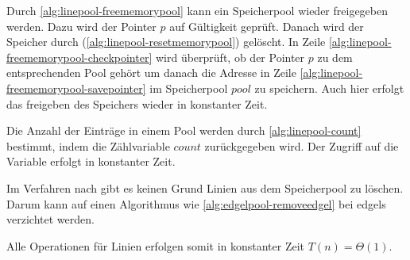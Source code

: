 

Durch \autoref{alg:linepool-freememorypool} kann ein Speicherpool wieder freigegeben werden. Dazu wird der Pointer $p$
 auf Gültigkeit geprüft. Danach wird der Speicher durch 
 (\autoref{alg:linepool-resetmemorypool}) gelöscht. In Zeile \ref{alg:linepool-freememorypool-checkpointer} wird
 überprüft, ob der Pointer $p$ zu dem entsprechenden Pool gehört um danach die Adresse in Zeile
 \ref{alg:linepool-freememorypool-savepointer} im Speicherpool $\mathit{pool}$ zu speichern. Auch hier erfolgt das
 freigeben des Speichers wieder in konstanter Zeit.



Die Anzahl der Einträge in einem Pool werden durch \autoref{alg:linepool-count} bestimmt, indem die Zählvariable
 $\mathit{count}$ zurückgegeben wird. Der Zugriff auf die Variable erfolgt in konstanter Zeit.



Im Verfahren nach \citeauthor{clarke96} gibt es keinen Grund Linien aus dem Speicherpool zu löschen. Darum kann auf
 einen Algorithmus wie \autoref{alg:edgelpool-removeedgel} bei \gls{edgels} verzichtet werden.

Alle Operationen für Linien erfolgen somit in konstanter Zeit $T(n) = \Theta(1)$.







